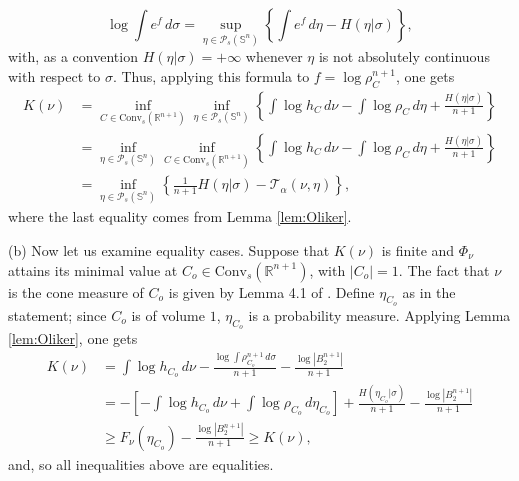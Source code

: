 \documentclass[10pt]{amsart}
\theoremstyle{definition}
\theoremstyle{remark}
\newcommand{\R}{\mathbb{R}}
\newcommand{\Sd}{\mathbb{S}}
\begin{document}
\[
\log \int e^f\,d\sigma = \sup_{\eta \in \mathcal{P}_s(\Sd^n)}\left\{\int e^f\,d\eta - H(\eta | \sigma)\right\},
\]
with, as a convention $H(\eta | \sigma) = +\infty$ whenever $\eta$ is not absolutely continuous with respect to $\sigma$. Thus, applying this formula to $f = \log \rho_C^{n+1}$, one gets
\begin{align*}
K(\nu) &= \inf_{C\in \mathrm{Conv}_s(\R^{n+1})} \inf_{\eta \in \mathcal{P}_s(\Sd^n)} \left\{\int \log h_C\,d\nu - \int \log \rho_C\,d\eta+\frac{H(\eta|\sigma)}{n+1} \right\}\\
&=  \inf_{\eta \in \mathcal{P}_s(\Sd^n)} \inf_{C\in \mathrm{Conv}_s(\R^{n+1})}\left\{\int \log h_C\,d\nu - \int \log \rho_C\,d\eta+\frac{H(\eta|\sigma)}{n+1} \right\}\\
&=  \inf_{\eta \in \mathcal{P}_s(\Sd^n)} \left\{\frac{1}{n+1}H(\eta|\sigma)-\mathcal{T}_\alpha(\nu,\eta)\right\},
\end{align*}
where the last equality comes from Lemma \ref{lem:Oliker}. 

(b) Now let us examine equality cases. Suppose that $K(\nu)$ is finite and $\Phi_\nu$ attains its minimal value at $C_o \in \mathrm{Conv}_s(\R^{n+1})$, with $|C_o|=1$. The fact that $\nu$ is the cone measure of $C_o$ is given by Lemma 4.1 of \cite{BLYZ13}. Define $\eta_{C_o}$ as in the statement; since $C_o$ is of volume $1$, $\eta_{C_o}$ is a probability measure. Applying Lemma \ref{lem:Oliker}, one gets
\begin{align*}
K(\nu) &=  \int \log h_{C_o}\,d\nu - \frac{\log \int \rho_{C_o}^{n+1}\,d\sigma}{n+1} - \frac{\log |B_2^{n+1}|}{n+1}\\
& = - \left[-\int \log h_{C_o}\,d\nu + \int \log \rho_{C_o}\,d\eta_{C_o}\right] + \frac{H(\eta_{C_o}|\sigma)}{n+1}- \frac{\log |B_2^{n+1}|}{n+1}\\
& \geq F_\nu(\eta_{C_o})- \frac{\log |B_2^{n+1}|}{n+1} \geq K(\nu),
\end{align*}
and, so all inequalities above are equalities.
\endproof
\end{document}
